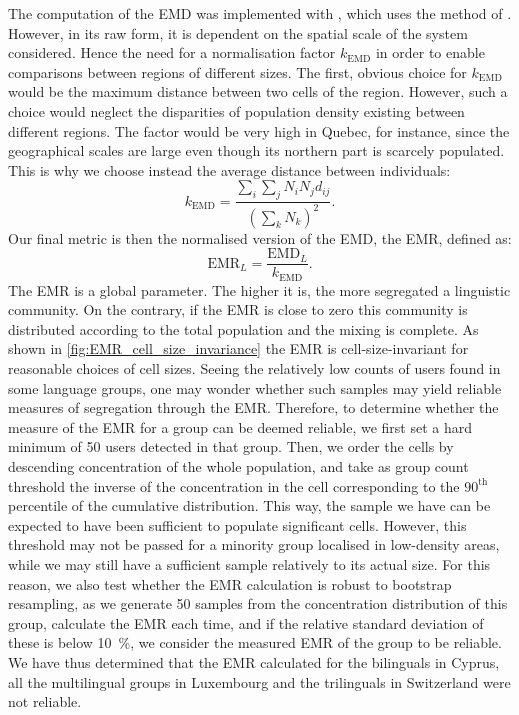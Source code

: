 \documentclass[../thesis.tex]{subfiles}
\begin{document}
The computation of the \ac{EMD} was implemented with \cite{FlamaryPOTPython2021}, which
uses the method of \cite{BonneelDisplacementInterpolation2011}. However, in its raw
form, it is dependent on the spatial scale of the system considered. Hence the need for
a normalisation factor $k_\text{EMD}$ in order to enable comparisons between regions of
different sizes. The first, obvious choice for $k_\text{EMD}$ would be the maximum
distance between two cells of the region. However, such a choice would neglect the
disparities of population density existing between different regions. The factor would
be very high in Quebec, for instance, since the geographical scales are large even
though its northern part is scarcely populated. This is why we choose instead the
average distance between individuals:
\begin{equation}
    k_\text{EMD} = \frac{\sum_i \sum_j N_i N_j d_{ij} }{\left( \sum_k N_k \right)^2}.
\end{equation}
Our final metric is then the normalised version of the \ac{EMD}, the \acf{EMR}, defined
as:
\begin{equation}
    \text{EMR}_L = \frac{\text{EMD}_L}{k_\text{EMD}} .
\end{equation}
The \ac{EMR} is a global parameter. The higher it is, the more segregated a linguistic
community. On the contrary, if the \ac{EMR} is close to zero this community is
distributed according to the total population and the mixing is complete. As shown in
\cref{fig:EMR_cell_size_invariance} the \ac{EMR} is cell-size-invariant for reasonable
choices of cell sizes. Seeing the relatively low counts of users found in some language
groups, one may wonder whether such samples may yield reliable measures of segregation
through the \ac{EMR}. Therefore, to determine whether the measure of the \ac{EMR} for a
group can be deemed reliable, we first set a hard minimum of 50 users detected in that
group. Then, we order the cells by descending concentration of the whole population, and
take as group count threshold the inverse of the concentration in the cell corresponding
to the $90^\textrm{th}$ percentile of the cumulative distribution. This way, the sample
we have can be expected to have been sufficient to populate significant cells. However,
this threshold may not be passed for a minority group localised in low-density areas,
while we may still have a sufficient sample relatively to its actual size. For this
reason, we also test whether the \ac{EMR} calculation is robust to bootstrap resampling,
as we generate 50 samples from the concentration distribution of this group, calculate
the \ac{EMR} each time, and if the relative standard deviation of these is below
\SI{10}{\percent}, we consider the measured \ac{EMR} of the group to be reliable. We
have thus determined that the \ac{EMR} calculated for the bilinguals in Cyprus, all the
multilingual groups in Luxembourg and the trilinguals in Switzerland were not reliable.
\end{document}
